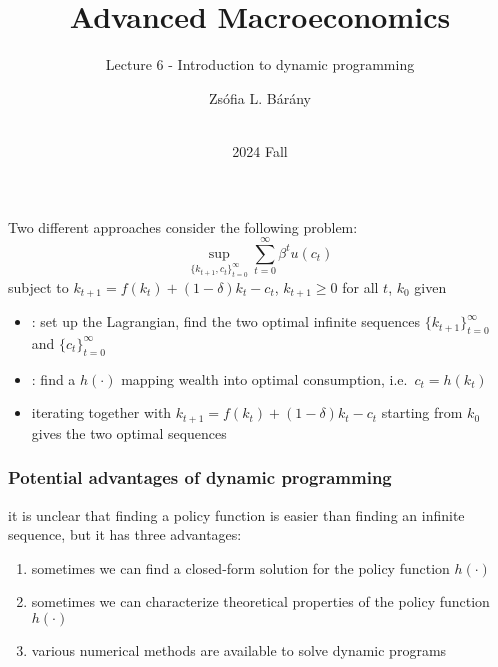 \documentclass[compress,aspectratio=169]{beamer}
\title{Advanced Macroeconomics }
\subtitle{Lecture 6 - Introduction to dynamic programming}
\author{Zs\'ofia L. B\'ar\'any}
\institute{CEU}
\date[]{\\2024 Fall}
\begin{document}
\def\newblock{\hskip .11em plus .33em minus .07em}

\begin{frame}
\titlepage
\end{frame}


\begin{frame}{Two different approaches}
consider the following problem:
\begin{displaymath}
\sup_{\{k_{t+1},c_t\}_{t=0}^{\infty}}\sum_{t=0}^{\infty}\beta^t u(c_t)
\end{displaymath}
subject to $k_{t+1}=f(k_t)+(1-\delta)k_t-c_t$, $k_{t+1}\geq 0$ for all $t$, $k_0$ given
\vspace{3 mm}

\begin{itemize}
\item {\color{green!60!blue}{direct approach}}: set up the Lagrangian, find the two optimal infinite sequences $\{k_{t+1}\}_{t=0}^{\infty}$ and $\{c_t\}_{t=0}^{\infty}$
\vspace{2 mm}
\item {\color{red!70!white}{dynamic programming approach}}: find a {\color{red!70!white}{time-invariant policy function}} $h(\cdot)$ mapping wealth into optimal consumption, i.e.\ $c_t=h(k_t)$\\
\item[] iterating together with $k_{t+1}=f(k_t)+(1-\delta)k_t-c_t$ starting from $k_0$ gives the two optimal sequences
\end{itemize}
\end{frame}

\begin{frame}
\frametitle{Potential advantages of dynamic programming}
it is unclear that finding a policy function is easier than finding an infinite sequence, but it has three advantages:
\vspace{3 mm}
\begin{enumerate}
\item sometimes we can find a closed-form solution for the policy function $h(\cdot)$
\vspace{3 mm}
\item sometimes we can characterize theoretical properties of the policy function $h(\cdot)$
\vspace{3 mm}
\item various numerical methods are available to solve dynamic programs
\end{enumerate}
\end{frame}
\end{document}
